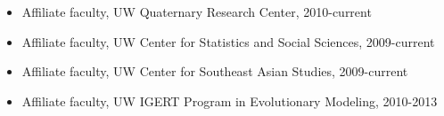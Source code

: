\begin{itemize}[noitemsep, font=$\bullet$\scshape\bfseries]
\item Affiliate faculty, UW Quaternary Research Center, 2010-current

\item  Affiliate faculty, UW Center for Statistics and Social Sciences, 2009-current

\item  Affiliate faculty, UW Center for Southeast Asian Studies, 2009-current

\item  Affiliate faculty, UW IGERT Program in Evolutionary Modeling, 2010-2013

\end{itemize}

\medskip

